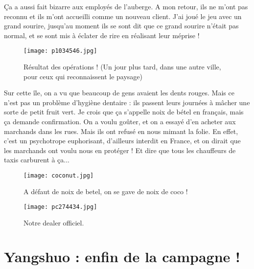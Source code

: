 \documentclass{book}
\begin{document}
Ça a aussi fait bizarre aux employés de l'auberge. A mon retour, ils ne m'ont pas reconnu et ils m'ont accueilli comme un nouveau client. J'ai joué le jeu avec un grand sourire, jusqu'au moment ils se sont dit que ce grand sourire n'était pas normal, et se sont mis à éclater de rire en réalisant leur méprise !


\begin{figure}[h]
\centering
\texttt{[image: p1034546.jpg]}
\caption*{Résultat des opérations ! (Un jour plus tard, dans une autre ville, pour ceux qui reconnaissent le paysage)}
\end{figure}

Sur cette île, on a vu que beaucoup de gens avaient les dents rouges. Mais ce n'est pas un problème d'hygiène dentaire : ils passent leurs journées à mâcher une sorte de petit fruit vert. Je crois que ça s'appelle noix de bétel en français, mais ça demande confirmation. On a voulu goûter, et on a essayé d'en acheter aux marchands dans les rues. Mais ils ont refusé en nous mimant la folie. En effet, c'est un psychotrope euphorisant, d'ailleurs interdit en France, et on dirait que les marchands ont voulu nous en protéger ! Et dire que tous les chauffeurs de taxis carburent à ça...


\begin{figure}[h]
\centering
\texttt{[image: coconut.jpg]}
\caption*{A défaut de noix de betel, on se gave de noix de coco !}
\end{figure}


\begin{figure}[h]
\centering
\texttt{[image: pc274434.jpg]}
\caption*{Notre dealer officiel.}
\end{figure}



\chapter{Yangshuo : enfin de la campagne  !}
\end{document}
